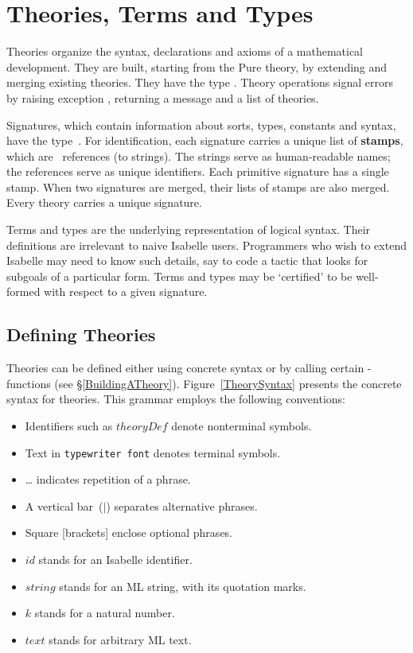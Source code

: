 
\chapter{Theories, Terms and Types} \label{theories}
Theories organize the syntax, declarations and axioms of a mathematical
development.  They are built, starting from the Pure theory, by extending
and merging existing theories.  They have the \ML{} type .
Theory operations signal errors by raising exception ,
returning a message and a list of theories.

Signatures, which contain information about sorts, types, constants and
syntax, have the \ML{} type~.  For identification,
each signature carries a unique list of {\bf stamps}, which are~\ML{}
references (to strings).  The strings serve as human-readable names; the
references serve as unique identifiers.  Each primitive signature has a
single stamp.  When two signatures are merged, their lists of stamps are
also merged.  Every theory carries a unique signature.

Terms and types are the underlying representation of logical syntax.  Their
\ML{} definitions are irrelevant to naive Isabelle users.  Programmers who wish
to extend Isabelle may need to know such details, say to code a tactic that
looks for subgoals of a particular form.  Terms and types may be
`certified' to be well-formed with respect to a given signature.

\section{Defining Theories}
\label{DefiningTheories}

Theories can be defined either using concrete syntax or by calling certain
\ML-functions (see \S\ref{BuildingATheory}).  Figure~\ref{TheorySyntax}
presents the concrete syntax for theories.  This grammar employs the
following conventions: 
\begin{itemize}
\item Identifiers such as $theoryDef$ denote nonterminal symbols.
\item Text in {\tt typewriter font} denotes terminal symbols.
\item \ldots{} indicates repetition of a phrase.
\item A vertical bar~($|$) separates alternative phrases.
\item Square [brackets] enclose optional phrases.
\item $id$ stands for an Isabelle identifier.
\item $string$ stands for an ML string, with its quotation marks.
\item $k$ stands for a natural number.
\item $text$ stands for arbitrary ML text.
\end{itemize}

